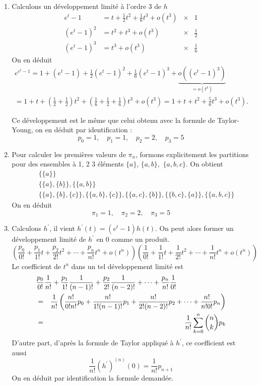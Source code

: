\begin{enumerate}
\item  Calculons un d{\'e}veloppement limit{\'e} {\`a} l'ordre 3 de $h$
\begin{align*}
e^{t}-1       &= t + \frac{1}{2}t^{2} + \frac{1}{6}t^{3} + o(t^{3}) &\times& 1\\
(e^{t}-1)^{2} &=  t^{2} + t^{3} + o(t^{3}) &\times& \frac{1}{2}\\
(e^{t}-1)^{3} &=  t^{3} + o(t^{3}) &\times& \frac{1}{6}
\end{align*}
On en déduit
\begin{multline*}
e^{e^{t}-1} 
 = 1 + (e^{t}-1) + \frac{1}{2}(e^{t}-1)^{2} + \frac{1}{6}(e^{t}-1)^{3} + \underbrace{o((e^{t}-1)^{3})}_{=o(t^{3})} \\
 = 1 + t + (\frac{1}{2} + \frac{1}{2})t^{2} + (\frac{1}{6} + \frac{1}{2} + \frac{1}{6})t^{3} + o(t^{3}) 
 = 1 + t + t^{2} + \frac{5}{6}t^{3} + o(t^{3}).
\end{multline*}

Ce d{\'e}veloppement est le m{\^e}me que celui obtenu avec la formule de Taylor-Young, on en d{\'e}duit par identification :
\[
p_{0}=1,\quad p_{1}=1,\quad p_{2}=2,\quad p_{3}=5
\]

\item  Pour calculer les premi{\`e}res valeurs de $\pi _{n}$, formons
explicitement les partitions pour des ensembles {\`a} 1, 2 3
{\'e}l{\'e}ments $\{a\}$, $\{a,b\},$ $\{a,b,c\}$. On obtient
\begin{eqnarray*}
&&\{\{a\}\} \\
&&\{\{a\},\{b\}\},\{\{a,b\}\} \\
&&\{\{a\},\{b\},\{c\}\},\{\{a,b\},\{c\}\},\{\{a,c\},\{b\}\},\{\{b,c\},\{a\}%
\},\{\{a,b,c\}\}
\end{eqnarray*}
On en d{\'e}duit
\[
\pi _{1}=1,\quad \pi _{2} = 2,\quad \pi _{3}=5
\]

\item  Calculons $h^{\prime }$, il vient $h^{\prime }(t)=(e^{t}-1)h(t)$. On peut alors former un d{\'e}veloppement limit{\'e} de $h^{\prime }$ en 0 comme un produit.
\[
(\frac{p_{0}}{0!}+\frac{p_{1}}{1!}t+\frac{p_{2}}{2!}t^{2}+\cdots +\frac{p_{n}}{n!}t^{n}+o(t^{n}))(\frac{1}{0!}+\frac{1}{1!}t+\frac{1}{2!}t^{2}+\cdots +\frac{1}{n!}t^{n}+o(t^{n}))
\]
Le coefficient de $t^{n}$ dans un tel d{\'e}veloppement limit{\'e} est
\begin{eqnarray*}
\lefteqn{\frac{p_{0}}{0!}\frac{1}{n!}+\frac{p_{1}}{1!}\frac{1}{(n-1)!}+\frac{p_{2}}{2!}\frac{1}{(n-2)!}+\cdots +\frac{p_{n}}{n!}\frac{1}{0!}} \\&=&
\frac{1}{n!}\left( \frac{n!}{0!n!}p_{0}+\frac{n!}{1!(n-1)!}p_{1}+\frac{n!}{2!(n-2)!}p_{2}+\cdots +\frac{n!}{n!0!}p_{n}\right) \\
&=&\frac{1}{n!}\sum_{k=0}^{n}\binom{n}{k}p_{k}
\end{eqnarray*}
D'autre part, d'apr{\`e}s la formule de Taylor appliqu{\'e} {\`a} $h^{\prime
}$, ce coefficient est aussi
\[
\frac{1}{n!}(h^{\prime })^{(n)}(0)=\frac{1}{n!}p_{n+1}
\]
On en d{\'e}duit par identification la formule demand{\'e}e.


\end{enumerate}
